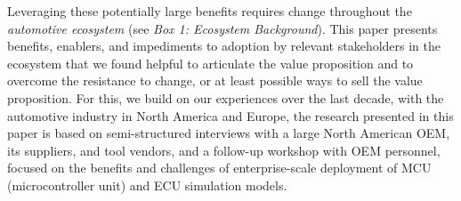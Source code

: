 Leveraging these potentially large benefits requires change throughout the \emph{automotive ecosystem} (see \emph{Box 1: Ecosystem Background}). 
This paper presents benefits, enablers, and impediments to adoption by relevant stakeholders in the ecosystem that we found helpful to articulate the value proposition and to overcome the resistance to change, or at least possible ways to sell the value proposition.
For this, we build on our experiences over the last decade,
with the automotive industry in North America and Europe,
the research presented in this paper is based on 
semi-structured interviews with a large North American OEM, its suppliers, and tool vendors,
and a follow-up workshop with OEM personnel,
focused on the benefits and challenges of 
enterprise-scale deployment of MCU (microcontroller unit) and ECU
simulation models.

